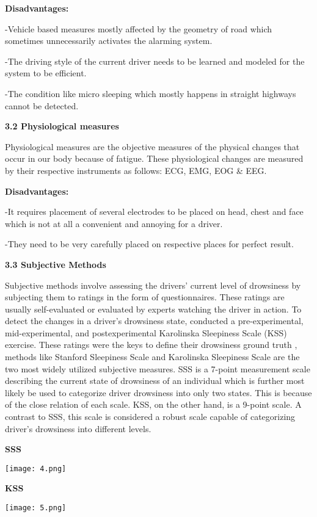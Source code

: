 \documentclass[a4paper,12pt]{article}
\begin{document}
\textbf{Disadvantages:}

-Vehicle based measures mostly affected by the geometry of road which
sometimes unnecessarily activates the alarming system.

-The driving style of the current driver needs to be learned and modeled
for the system to be efficient.

-The condition like micro sleeping which mostly happens in straight
highways cannot be detected.

\textbf{3.2 Physiological measures}

Physiological measures are the objective measures of the physical
changes that occur in our body because of fatigue. These physiological
changes are measured by their respective instruments as follows: ECG,
EMG, EOG \& EEG.

\textbf{Disadvantages:}

-It requires placement of several electrodes to be placed on head, chest
and face which is not at all a convenient and annoying for a driver.

-They need to be very carefully placed on respective places for perfect
result.

\textbf{3.3 Subjective Methods}

Subjective methods involve assessing the drivers' current level of
drowsiness by subjecting them to ratings in the form of questionnaires.
These ratings are usually self-evaluated or evaluated by experts
watching the driver in action. To detect the changes in a driver's
drowsiness state, conducted a pre-experimental, mid-experimental, and
postexperimental Karolinska Sleepiness Scale (KSS) exercise. These
ratings were the keys to define their drowsiness ground truth , methods
like Stanford Sleepiness Scale and Karolinska Sleepiness Scale are the
two most widely utilized subjective measures. SSS is a 7-point
measurement scale describing the current state of drowsiness of an
individual which is further most likely be used to categorize driver
drowsiness into only two states. This is because of the close relation
of each scale. KSS, on the other hand, is a 9-point scale. A contrast to
SSS, this scale is considered a robust scale capable of categorizing
driver's drowsiness into different levels.

\textbf{SSS}

\texttt{[image: 4.png]}

\textbf{KSS}

\texttt{[image: 5.png]}
\end{document}
